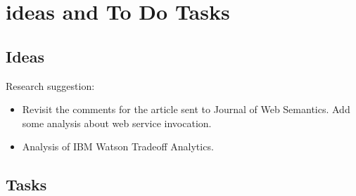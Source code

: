 \chapter{ideas and To Do Tasks}

\section{Ideas}
\label{sec:ideas}
Research suggestion:
\begin{itemize}
	\item Revisit the comments for the article sent to Journal of Web Semantics. Add some analysis about web service invocation.
	\item Analysis of IBM Watson Tradeoff Analytics.
\end{itemize}

\section{Tasks}
\label{sec:tasks}
